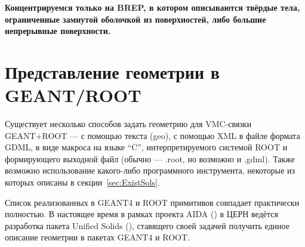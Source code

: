 \textbf{Концентрируемся только на BREP, в котором описываются твёрдые тела, ограниченные замнутой оболочкой из поверхностей, либо большие непрерывные поверхности.}



\section{Представление геометрии в GEANT/ROOT}\label{sec:secGeoROOT}

Существует несколько способов задать геометрию для VMC-связки GEANT+ROOT --- с помощью текста (geo), с помощью XML в файле формата GDML, в виде макроса на языке ``C'', интерпретируемого системой ROOT и формирующего выходной файл (обычно --- .root, но возможно и .gdml). Также возможно использование какого-либо программного инструмента, некоторые из которых описаны в секции~\ref{sec:ExistSols}.

Список реализованных в GEANT4 и ROOT примитивов совпадает практически полностью. В настоящее время в рамках проекта AIDA (\cite{AIDA}) в ЦЕРН ведётся разработка пакета Unified Solids (\cite{USOLIDS}), ставящего своей задачей получить единое описание геометрии в пакетах GEANT4 и ROOT.

